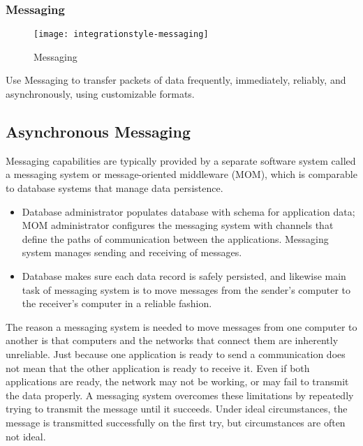 \subsubsection{Messaging}
\begin{minipage}{.4\textwidth}
\begin{figure}[H]
  \center
  \texttt{[image: integrationstyle-messaging]}
  \caption{Messaging}
\end{figure}
\end{minipage}
\begin{minipage}[b]{.6\textwidth}
Use Messaging to transfer packets of data frequently, immediately, reliably, and asynchronously, using customizable formats.
\end{minipage}

\subsection{Asynchronous Messaging}
Messaging capabilities are typically provided by a separate software system called a messaging system or message-oriented middleware (MOM), which is comparable to database systems that manage data persistence.

\begin{itemize}
	\item Database administrator populates database with schema for application data; MOM administrator configures the messaging system with channels that define the paths of communication between the applications. Messaging system manages sending and receiving of messages.
	\item Database makes sure each data record is safely persisted, and likewise main task of messaging system is to move messages from the sender’s computer to the receiver’s computer in a reliable fashion.
\end{itemize}

The reason a messaging system is needed to move messages from one computer to another is that computers and the networks that connect them are inherently unreliable. Just because one application is ready to send a communication does not mean that the other application is ready to receive it. Even if both applications are ready, the network may not be working, or may fail to transmit the data properly. A messaging system overcomes these limitations by repeatedly trying to transmit the message until it succeeds. Under ideal circumstances, the message is transmitted successfully on the first try, but circumstances are often not ideal.

